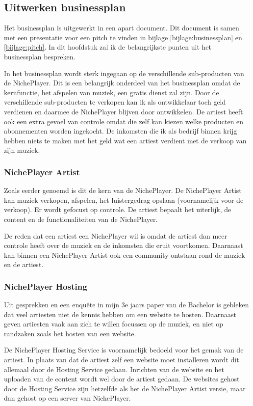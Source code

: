 \subsection {Uitwerken businessplan}

Het businessplan is uitgewerkt in een apart document. Dit document is samen met een presentatie voor een pitch te vinden in bijlage \ref{bijlage:businessplan} en \ref{bijlage:pitch}. In dit hoofdstuk zal ik de belangrijkste punten uit het businessplan bespreken.

In het businessplan wordt sterk ingegaan op de verschillende sub-producten van de NichePlayer. Dit is een belangrijk onderdeel van het businessplan omdat de kernfunctie, het afspelen van muziek, een gratis dienst zal zijn. Door de verschillende sub-producten te verkopen kan ik als ontwikkelaar toch geld verdienen en daarmee de NichePlayer blijven door ontwikkelen. De artiest heeft ook een extra gevoel van controle omdat die zelf kan kiezen welke producten en abonnementen worden ingekocht. De inkomsten die ik als bedrijf binnen krijg hebben niets te maken met het geld wat een artiest verdient met de verkoop van zijn muziek.

\subsubsection*{NichePlayer Artist}
Zoals eerder genoemd is dit de kern van de NichePlayer. De NichePlayer Artist kan muziek verkopen, afspelen, het luistergedrag opslaan (voornamelijk voor de verkoop). Er wordt gefocust op controle. De artiest bepaalt het uiterlijk, de content en de functionaliteiten van de NichePlayer.

De reden dat een artiest een NichePlayer wil is omdat de artiest dan meer controle heeft over de muziek en de inkomsten die eruit voortkomen. Daarnaast kan binnen een NichePlayer Artist ook een community ontstaan rond de muziek en de artiest.

\subsubsection*{NichePlayer Hosting}
Uit gesprekken en een enquête in mijn 3e jaars paper van de Bachelor is gebleken dat veel artiesten niet de kennis hebben om een website te hosten. Daarnaast geven artiesten vaak aan zich te willen focussen op de muziek, en niet op randzaken zoals het hosten van een website.

De NichePlayer Hosting Service is voornamelijk bedoeld voor het gemak van de artiest. In plaats van dat de artiest zelf een website moet installeren wordt dit allemaal door de Hosting Service gedaan. Inrichten van de website en het uploaden van de content wordt wel door de artiest gedaan. De websites gehost door de Hosting Service zijn hetzelfde als het de NichePlayer Artist versie, maar dan gehost op een server van NichePlayer.

